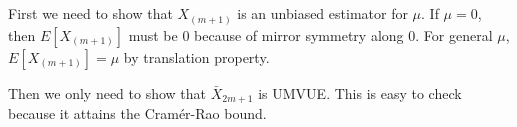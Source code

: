 \subsection{} %

First we need to show that $X_{(m+1)}$ is an unbiased estimator for $\mu$.
If $\mu=0$, then $E[X_{(m+1)}]$ must be $0$ because of mirror symmetry along $0$.
For general $\mu$, $E[X_{(m+1)}]=\mu$ by translation property.

Then we only need to show that $\bar{X}_{2m+1}$ is UMVUE.
This is easy to check because it attains the Cram\'er-Rao bound.

\subsection{} %

\todo
